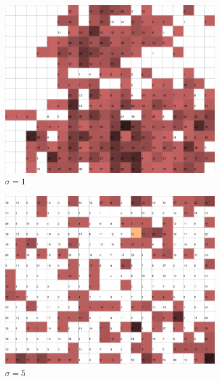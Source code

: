 \documentclass{acm_proc_article-sp}
\begin{document}
\begin{figure}
\centering
    \centering
    \begin{subfigure}[b]{0.30\linewidth}
        \includegraphics[width=\linewidth]{img/wine-newmid-topographic-error-sigma-1}
        \caption{$\sigma=1$}
    \end{subfigure}
    \begin{subfigure}[b]{0.30\linewidth}
        \includegraphics[width=\linewidth]{img/wine-newmid-topographic-error-sigma-5}
        \caption{$\sigma=5$}
    \end{subfigure}
    \begin{subfigure}[b]{0.30\linewidth}

\end{subfigure}
\end{figure}
\end{document}
